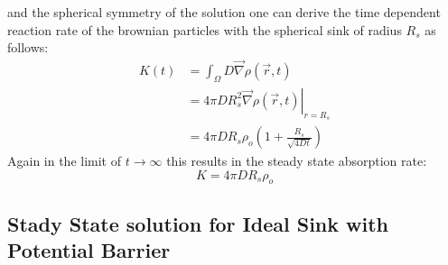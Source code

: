and the spherical symmetry of the solution one can derive the time dependent reaction rate of the brownian particles with the spherical sink of radius $R_s$ as follows:
\begin{align}
    K(t) &= \int_\Omega D  \vec{\nabla} \rho(\vec{r},t) \\
    &= 4 \pi D R_s^2 \left. \vec{\nabla} \rho(\vec{r},t) \right|_{r = R_s}\\
    &= 4 \pi D R_s \rho_o \left( 1 + \frac{R_s}{\sqrt{4Dt}} \right)
    \label{ideal reaction rate}
\end{align}
Again in the limit of $t \rightarrow \infty$ this results in the steady state absorption rate:
\begin{equation}
    K = 4 \pi D R_s \rho_o
    \label{steady state ideal rate}
\end{equation}

\subsection{Stady State solution for Ideal Sink with Potential Barrier}

